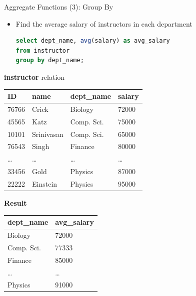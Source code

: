 \documentclass[aspectratio=169, xcolor=dvipsnames]{beamer}
\begin{document}
\begin{frame}[fragile]{Aggregate Functions (3): Group By}
    \begin{itemize}
        \item Find the average salary of instructors in each department
        \begin{lstlisting}[language=SQL]
select dept_name, avg(salary) as avg_salary 
from instructor 
group by dept_name;
        \end{lstlisting}
    \end{itemize}

    \vspace{1em}
    \begin{minipage}{0.65\textwidth}
        \small
        \textbf{instructor} relation
        \begin{center}
            \begin{tabular}{|l|l|l|l|}
            \hline
            \textbf{ID} & \textbf{name} & \textbf{dept\_name} & \textbf{salary} \\ \hline
            76766 & Crick & Biology & 72000 \\ \hline
            45565 & Katz & Comp. Sci. & 75000 \\ \hline
            10101 & Srinivasan & Comp. Sci. & 65000 \\ \hline
            76543 & Singh & Finance & 80000 \\ \hline
            \dots & \dots & \dots & \dots \\ \hline
            33456 & Gold & Physics & 87000 \\ \hline
            22222 & Einstein & Physics & 95000 \\ \hline
            \end{tabular}
        \end{center}
    \end{minipage}%
    \begin{minipage}{0.35\textwidth}
        \small
        \textbf{Result}
        \begin{center}
            \begin{tabular}{|l|l|}
            \hline
            \textbf{dept\_name} & \textbf{avg\_salary} \\ \hline
            Biology & 72000 \\ \hline
            Comp. Sci. & 77333 \\ \hline
            Finance & 85000 \\ \hline
            \dots & \dots \\ \hline
            Physics & 91000 \\ \hline
            \end{tabular}
        \end{center}
    \end{minipage}
\end{frame}
\end{document}
